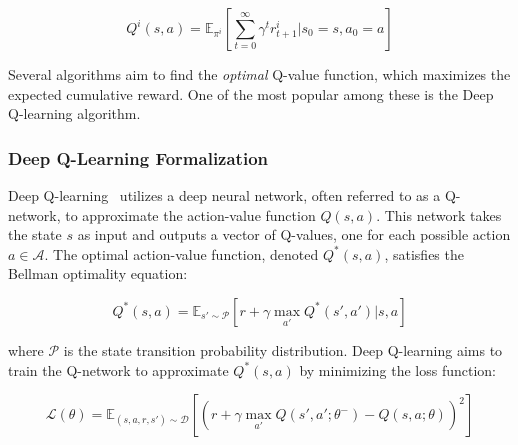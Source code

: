 \documentclass[sigconf]{acmart}
\begin{document}
\[ Q^i(s, a) = \mathbb{E}_{\pi^i} \left[ \sum_{t=0}^{\infty} \gamma^t r^i_{t+1} | s_0 = s, a_0 = a \right] \]



Several algorithms aim to find the \emph{optimal} Q-value function, which maximizes the expected cumulative reward. One of the most popular among these is the Deep Q-learning algorithm.
\subsubsection{Deep Q-Learning Formalization}
Deep Q-learning~\cite{DBLP:conf/l4dc/FanWXY20} utilizes a deep neural network, 
often referred to as a Q-network, to approximate the action-value function $Q(s, a)$. 
This network takes the state $s$ as input and outputs a vector of Q-values, one for each possible action $a \in \mathcal{A}$.  
The optimal action-value function, denoted $Q^*(s, a)$, satisfies the Bellman optimality equation:

\[ Q^*(s, a) = \mathbb{E}_{s' \sim \mathcal{P}} \left[ r + \gamma \max_{a'} Q^*(s', a') | s, a \right] \]

where $\mathcal{P}$ is the state transition probability distribution.  
Deep Q-learning aims to train the Q-network to approximate $Q^*(s, a)$ by minimizing the loss function:

\[ \mathcal{L}(\theta) = \mathbb{E}_{(s, a, r, s') \sim \mathcal{D}} \left[ \left( r + \gamma \max_{a'} Q(s', a'; \theta^-) - Q(s, a; \theta) \right)^2 \right] \]
\end{document}
